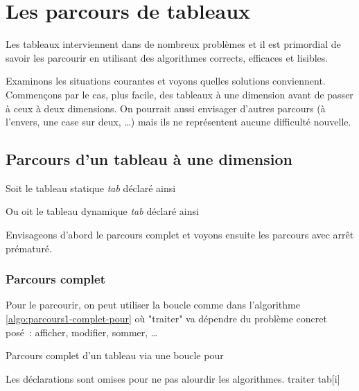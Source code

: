 \chapter{Les parcours de tableaux} 

Les tableaux interviennent dans de nombreux problèmes 
et il est primordial de savoir les parcourir 
en utilisant des algorithmes
corrects, efficaces et lisibles.

Examinons les situations courantes et voyons quelles solutions conviennent.
Commençons par le cas, plus facile, des tableaux à une dimension
avant de passer à ceux à deux dimensions.
On pourrait aussi envisager d'autres parcours
(à l'envers, une case sur deux, \dots) 
mais ils ne représentent aucune difficulté nouvelle.

\section{Parcours d'un tableau à une dimension} \label{Les parcours de tableaux}

Soit le tableau statique \textit{tab} déclaré ainsi


Ou oit le tableau dynamique \textit{tab} déclaré ainsi



Envisageons d'abord le parcours complet
et voyons ensuite les parcours avec arrêt prématuré.

\subsection{Parcours complet}

Pour le parcourir, on peut utiliser la boucle 
comme dans l'algorithme \vref{algo:parcours1-complet-pour}
où "traiter" va dépendre du problème concret posé~:
afficher, modifier, sommer, \dots

\begin{algorithm}[H]
\begin{pseudo}
	\caption{Parcours complet d'un tableau via une boucle pour}
	\label{algo:parcours1-complet-pour}
	\LComment Les déclarations sont omises pour ne pas alourdir les algorithmes.
		\Stmt traiter tab[i]
	\EndFor
\end{pseudo}
\end{algorithm}


